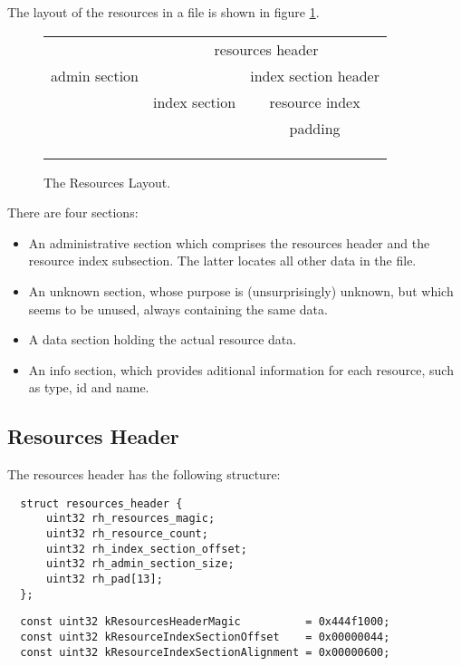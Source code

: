 \documentclass[12pt, a4paper]{article}
\newcommand{\codeblockbegin}{\begin{flushleft}\begin{minipage}{\textwidth}}
\newcommand{\codeblockend}{\end{minipage}\end{flushleft}}
\begin{document}
The layout of the resources in a file is shown in figure
\ref{fig:resources-layout}.

\begin{figure}[h!tb]
  \begin{center}
  \begin{tabular}{|c|c|c|}
  \hline
                & \multicolumn{2}{c|}{resources header}\\
  \hhline{|~==|}
  admin section &               & index section header \\
  \hhline{~~|-|}
                & index section & resource index \\
  \hhline{~~|-|}
                &               & padding \\
  \hhline{:===:}
  \multicolumn{3}{|c|}{unknown section}\\
  \hhline{:===:}
  \multicolumn{3}{|c|}{data section}\\
  \hhline{|~~~|}
  \hhline{:===:}
  \multicolumn{3}{|c|}{info section}\\
  \hline
  \end{tabular}
  \end{center}
  \caption{The Resources Layout.}
  \label{fig:resources-layout}
\end{figure}

\noindent
There are four sections:
%
\begin{itemize}
\item{An administrative section which comprises the resources header and the
  resource index subsection. The latter locates all other data in the file.
}
\item{An unknown section, whose purpose is (unsurprisingly) unknown, but which
  seems to be unused, always containing the same data.
}
\item{A data section holding the actual resource data.
}
\item{An info section, which provides aditional information for each resource,
  such as type, id and name.
}
\end{itemize}


\subsection{Resources Header}
\label{resources-header}

The resources header has the following structure:
%
\codeblockbegin
\begin{verbatim}
  struct resources_header {
      uint32 rh_resources_magic;
      uint32 rh_resource_count;
      uint32 rh_index_section_offset;
      uint32 rh_admin_section_size;
      uint32 rh_pad[13];
  };
\end{verbatim}
\codeblockend
%
\codeblockbegin
\begin{verbatim}
  const uint32 kResourcesHeaderMagic          = 0x444f1000;
  const uint32 kResourceIndexSectionOffset    = 0x00000044;
  const uint32 kResourceIndexSectionAlignment = 0x00000600;
\end{verbatim}
\codeblockend
\end{document}
